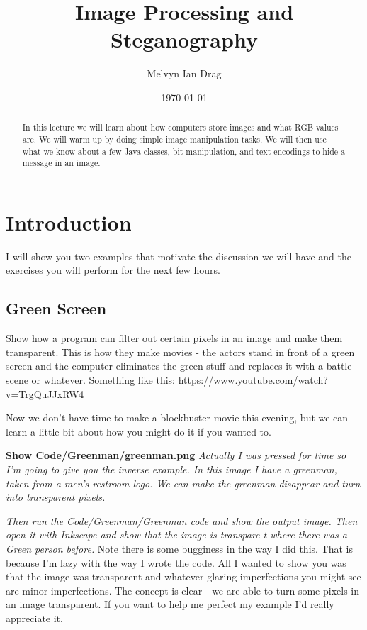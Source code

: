 \documentclass[12pt]{article}
\title{Image Processing and Steganography}
\author{
	Melvyn Ian Drag
}
\date{\today}
\begin{document}
\maketitle

\begin{abstract}
In this lecture we will learn about how computers store images and what RGB values are. We will warm up by doing simple image manipulation tasks. We will then use what we know about a few Java classes, bit manipulation, and text encodings to hide a message in an image.
\end{abstract}

\section{Introduction}
I will show you two examples that motivate the discussion we will have and the exercises you will perform for the next few hours.

\subsection{Green Screen}
Show how a program can filter out certain pixels in an image and make them transparent. This is how they make movies - the actors stand in front of a green screen and the computer eliminates the green stuff and replaces it with a battle scene or whatever. Something like this: \url{https://www.youtube.com/watch?v=TrgQuJJxRW4}

Now we don't have time to make a blockbuster movie this evening, but we can learn a little bit about how you might do it if you wanted to.

\begin{center}
\textbf{Show Code/Greenman/greenman.png}
\textit{Actually I was pressed for time so I'm going to give you the inverse example. In this image I have a greenman, taken from a men's restroom logo. We can make the greenman disappear and turn into transparent pixels.}
\end{center}

\textit{Then run the Code/Greenman/Greenman code and show the output image. Then open it with Inkscape and show that the image is transpare t where there was a Green person before.} Note there is some bugginess in the way I did this. That is because I'm lazy with the way I wrote the code. All I wanted to show you was that the image was transparent and whatever glaring imperfections you might see are minor imperfections. The concept is clear - we are able to turn some pixels in an image transparent. If you want to help me perfect my example I'd really appreciate it. 
\end{document}
